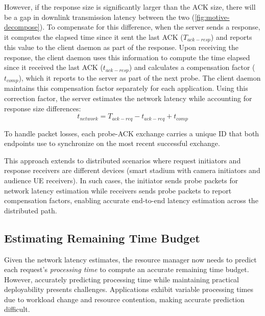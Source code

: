 However, if the response size is significantly larger than the ACK size, there will be a gap in downlink transmission latency between the two (\autoref{fig:motive-decompose}). 
To compensate for this difference, when the server sends a response, it computes the elapsed time since it sent the last ACK ($T_{ack-resp}$) and reports this value to the client daemon as part of the response. 
Upon receiving the response, the client daemon uses this information to compute the time elapsed since it received the last ACK ($t_{ack-resp}$) and calculates a compensation factor ($t_{comp}$), which it reports to the server as part of the next probe. 
The client daemon maintains this compensation factor separately for each application. 
Using this correction factor, the server estimates the network latency while accounting for response size differences:
\begin{equation}
    t_{network} = T_{ack-req} - t_{ack-req} + t_{comp}
\end{equation}

To handle packet losses, each probe-ACK exchange carries a unique ID that both endpoints use to synchronize on the most recent successful exchange.

This approach extends to distributed scenarios where request initiators and response receivers are different devices (\eg smart stadium with camera initiators and audience UE receivers).
In such cases, the initiator sends probe packets for network latency estimation while receivers sends probe packets to report compensation factors, enabling accurate end-to-end latency estimation across the distributed path.

\subsection{Estimating Remaining Time Budget}
\label{sec:deadline-estimation}

Given the network latency estimates, the resource manager now needs to predict each request's \emph{processing time} to compute an accurate remaining time budget.
However, accurately predicting processing time while maintaining practical deployability presents challenges.
Applications exhibit variable processing times due to workload change and resource contention, making accurate prediction difficult.

